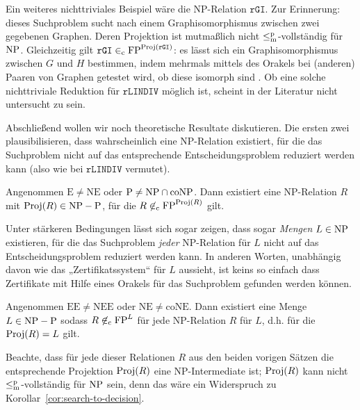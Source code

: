 Ein weiteres nichttriviales Beispiel wäre die NP-Relation $\mathtt{rGI}$. Zur Erinnerung: dieses Suchproblem sucht nach einem Graphisomorphismus zwischen zwei gegebenen Graphen.
Deren Projektion ist mutmaßlich nicht $\leq_\mathrm{m}^\mathrm{p}$-vollständig für $\mathrm{NP}$. 
Gleichzeitig gilt $\mathtt{rGI}\in_\mathrm{c} \mathrm{FP}^{\operatorname{Proj}(\mathtt{rGI})}$: es lässt sich ein Graphisomorphismus zwischen $G$ und $H$ bestimmen, indem mehrmals mittels des Orakels bei (anderen) Paaren von  Graphen getestet wird, ob diese isomorph sind \parencite[vgl.][S. 65, 100]{goldreich_computational_2008}.
Ob eine solche nichttriviale Reduktion für $\mathtt{rLINDIV}$ möglich ist, scheint in der Literatur nicht untersucht zu sein.

Abschließend wollen wir noch theoretische Resultate diskutieren. Die ersten zwei plausibilisieren, dass wahrscheinlich eine NP-Relation existiert, für die das Suchproblem nicht auf das entsprechende Entscheidungsproblem reduziert werden kann (also wie bei $\mathtt{rLINDIV}$ vermutet).

\begin{theorem}
    Angenommen $\mathrm{E\neq NE}$ oder $\mathrm{P}\neq \mathrm{NP}\cap\mathrm{coNP}$. Dann existiert eine NP-Relation $R$ mit $\operatorname{Proj}(R)\in \mathrm{NP}-\mathrm{P}$, für die $R\not\in_\mathrm{c}\mathrm{FP}^{\operatorname{Proj}(R)}$ gilt.
\end{theorem}

Unter stärkeren Bedingungen lässt sich sogar zeigen, dass sogar \emph{Mengen} $L\in\mathrm{NP}$ existieren, für die das Suchproblem \emph{jeder} NP-Relation für $L$ nicht auf das Entscheidungsproblem reduziert werden kann. In anderen Worten, unabhängig davon wie das „Zertifikatssystem“ für $L$ aussieht, ist keins so einfach dass Zertifikate mit Hilfe eines Orakels für das Suchproblem gefunden werden können.

\begin{theorem}
Angenommen $\mathrm{EE\neq NEE}$ oder $\mathrm{NE\neq coNE}$. Dann existiert eine Menge $L\in\mathrm{NP}-\mathrm{P}$ sodass $R\not\in_\mathrm{c} \mathrm{FP}^L$ für jede NP-Relation $R$ für $L$, d.h. für die $\operatorname{Proj}(R)=L$ gilt.
\end{theorem}
Beachte, dass für jede dieser Relationen $R$ aus den beiden vorigen Sätzen die entsprechende Projektion $\operatorname{Proj}(R)$ eine NP-Intermediate ist; $\operatorname{Proj}(R)$ kann nicht $\leq_\mathrm{m}^\mathrm{p}$-vollständig für $\mathrm{NP}$ sein, denn das wäre ein Widerspruch zu Korollar~\ref{cor:search-to-decision}.

